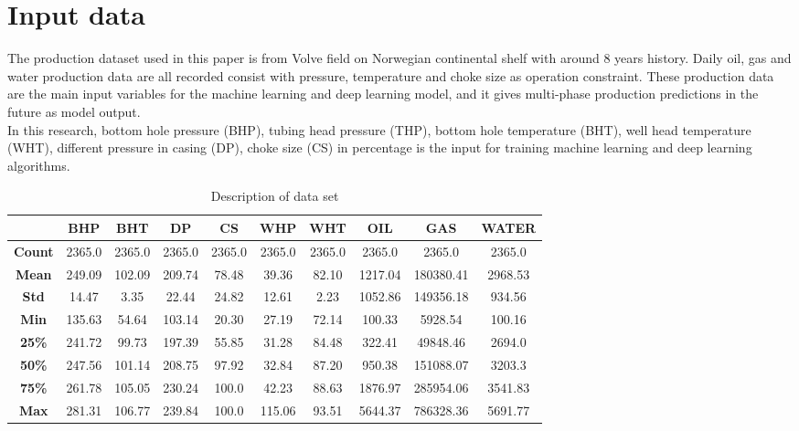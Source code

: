\documentclass[12pt,a4paper]{report}
\begin{document}
\section{Input data}
The production dataset used in this paper is from Volve field on Norwegian continental shelf with around 8 years history. Daily oil, gas and water production data are all recorded consist with pressure, temperature and choke size as operation constraint. These production data are the main input variables for the machine learning and deep learning model, and it gives multi-phase production predictions in the future as model output.\\
In this research, bottom hole pressure (BHP), tubing head pressure (THP), bottom hole temperature (BHT), well head temperature (WHT), different pressure in casing (DP), choke size (CS) in percentage is the input for training machine learning and deep learning algorithms.
\begin{table}[H]
\caption{Description of data set}
\centering
\begin{adjustbox}{width=1\textwidth}
\small
\begin{tabular}{|c|c|c|c|c|c|c|c|c|c|}
\hline
\textbf{}      & \textbf{BHP} & \textbf{BHT} & \textbf{DP} & \textbf{CS} & \textbf{WHP} & \textbf{WHT} & \textbf{OIL} & \textbf{GAS} & \textbf{WATER} \\ \hline
\textbf{Count} & 2365.0       & 2365.0       & 2365.0      & 2365.0      & 2365.0       & 2365.0       & 2365.0       & 2365.0       & 2365.0         \\ \hline
\textbf{Mean}  & 249.09       & 102.09       & 209.74      & 78.48       & 39.36        & 82.10        & 1217.04      & 180380.41    & 2968.53        \\ \hline
\textbf{Std}   & 14.47        & 3.35         & 22.44       & 24.82       & 12.61        & 2.23         & 1052.86      & 149356.18    & 934.56         \\ \hline
\textbf{Min}   & 135.63       & 54.64        & 103.14      & 20.30       & 27.19        & 72.14        & 100.33       & 5928.54      & 100.16         \\ \hline
\textbf{25\%}  & 241.72       & 99.73        & 197.39      & 55.85       & 31.28        & 84.48        & 322.41       & 49848.46     & 2694.0         \\ \hline
\textbf{50\%}  & 247.56       & 101.14       & 208.75      & 97.92       & 32.84        & 87.20        & 950.38       & 151088.07    & 3203.3         \\ \hline
\textbf{75\%}  & 261.78       & 105.05       & 230.24      & 100.0       & 42.23        & 88.63        & 1876.97      & 285954.06    & 3541.83        \\ \hline
\textbf{Max}   & 281.31       & 106.77       & 239.84      & 100.0       & 115.06       & 93.51        & 5644.37      & 786328.36    & 5691.77        \\ \hline
\end{tabular}
\end{adjustbox}
\end{table}
\end{document}
